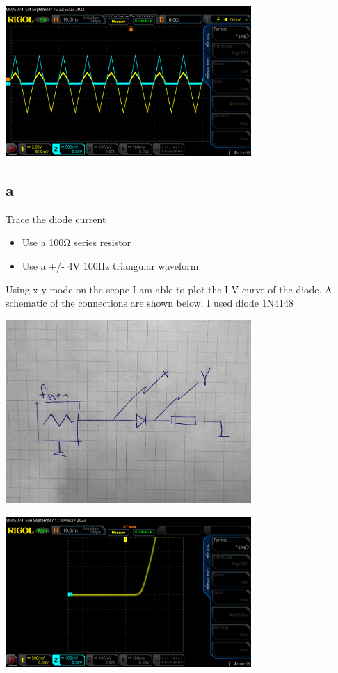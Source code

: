 \documentclass{article}
\begin{document}
	\begin{center}
	\includegraphics[width=0.7\textwidth]{diode2}
	\end{center}
	
	\subsection*{a}
	
	Trace the diode current
	
	\begin{itemize}
		\item Use a 100Ω series resistor
		\item Use a +/- 4V 100Hz triangular waveform
	\end{itemize}

	Using x-y mode on the scope I am able to plot the I-V curve of the diode. A schematic of the connections are shown below.
	I used diode 1N4148

	\begin{center}
	\includegraphics[width=0.7\textwidth]{sch}
	\end{center}

	\begin{center}
	\includegraphics[width=0.7\textwidth]{diode3}
	\end{center}
\end{document}
